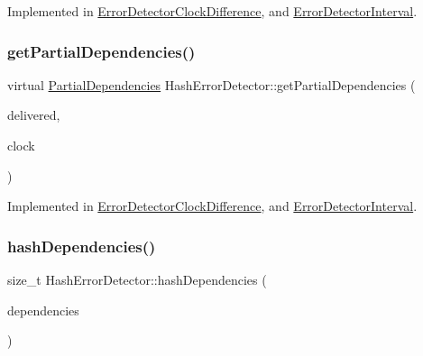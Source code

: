 Implemented in \hyperlink{class_error_detector_clock_difference_a15406c8d7652f3b9358b1958d3723933}{Error\+Detector\+Clock\+Difference}, and \hyperlink{class_error_detector_interval_a6cb5dc28ef7349060d15727e92a6780a}{Error\+Detector\+Interval}.

\mbox{\label{class_hash_error_detector_a5b9f7e8a6f63b1582e912102021c2d8d}} 
\subsubsection{\texorpdfstring{get\+Partial\+Dependencies()}{getPartialDependencies()}}
{\footnotesize\ttfamily virtual \hyperlink{class_partial_dependencies}{Partial\+Dependencies} Hash\+Error\+Detector\+::get\+Partial\+Dependencies (\begin{DoxyParamCaption}\item[{const vector$<$ \hyperlink{structures_8h_a7e7bdc1d2fff8a9436f2f352b2711ed6}{message\+Info} $>$ \&}]{delivered,  }\item[{const \hyperlink{class_probabilistic_clock}{Probabilistic\+Clock} \&}]{clock }\end{DoxyParamCaption})\hspace{0.3cm}{\ttfamily [pure virtual]}}



Implemented in \hyperlink{class_error_detector_clock_difference_a26f4c2905859947201d0a18146f2e961}{Error\+Detector\+Clock\+Difference}, and \hyperlink{class_error_detector_interval_a9494a918f551eb1efcab39ffd68316d6}{Error\+Detector\+Interval}.

\mbox{\label{class_hash_error_detector_a37d0ee7d8a01b530a03262e4483c53d9}} 
\subsubsection{\texorpdfstring{hash\+Dependencies()}{hashDependencies()}}
{\footnotesize\ttfamily size\+\_\+t Hash\+Error\+Detector\+::hash\+Dependencies (\begin{DoxyParamCaption}\item[{const vector$<$ unsigned int $>$ \&}]{dependencies }\end{DoxyParamCaption})}

